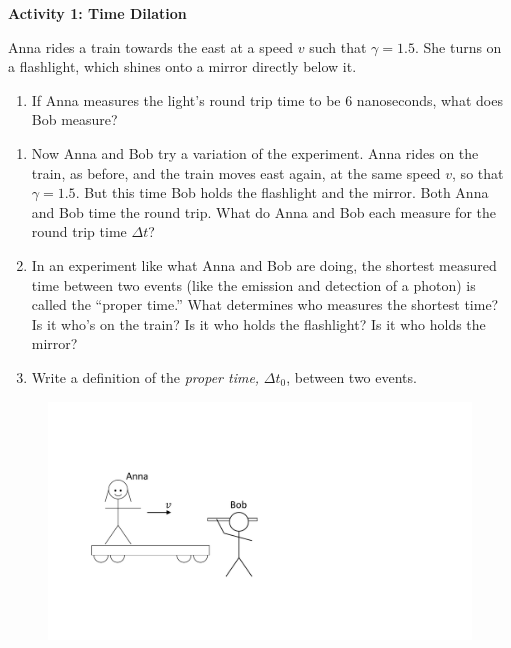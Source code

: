 \textbf{Activity 1: Time Dilation}

Anna rides a train towards the east at a speed $v$ such that $\gamma=1.5$.  She turns on a flashlight, which shines onto a mirror directly below it.

\begin{enumerate}[labparts]
\item If Anna measures the light's round trip time to be 6 nanoseconds, what does Bob measure?
\answerspace{0.5in}
\end{enumerate}

\begin{enumerate}
\item Now Anna and Bob try a variation of the experiment.  Anna rides on the train, as before, and the train moves east again, at the same speed $v$, so that $\gamma=1.5$.  But this time Bob holds the flashlight and the mirror.  Both Anna and Bob time the round trip.  What do Anna and Bob each measure for the round trip time $\Delta t$?
\answerspace{0.5in}

\item In an experiment like what Anna and Bob are doing, the shortest measured time between two events (like the emission and detection of a photon) is called the ``proper time.''  What determines who measures the shortest time? Is it who's on the train?  Is it who holds the flashlight?  Is it who holds the mirror?
\answerspace{0.5in}

\item Write a definition of the \textit{proper time,} $\Delta t_0$, between two events.
\answerspace{0.5in}
\end{enumerate}

\begin{figure}
\begin{center}
\vspace{-0.4in}
\includegraphics[scale=0.4]{time_dilation_length_contraction/anna_and_bob2.pdf}
\end{center}
\end{figure}

